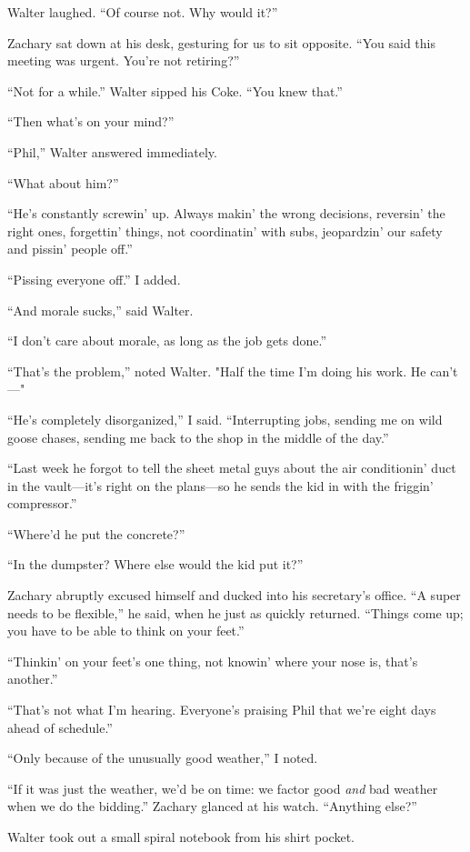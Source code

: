 Walter laughed. ``Of course not. Why would it?''

Zachary sat down at his desk, gesturing for us to sit opposite. ``You
said this meeting was urgent. You're not retiring?''

``Not for a while.'' Walter sipped his Coke. ``You knew that.''

``Then what's on your mind?''

``Phil,'' Walter answered immediately.

``What about him?''

``He's constantly screwin' up. Always makin' the wrong decisions,
reversin' the right ones, forgettin' things, not coordinatin' with subs,
jeopardzin' our safety and pissin' people off.''

``Pissing everyone off.'' I added.

``And morale sucks,'' said Walter.

``I don't care about morale, as long as the job gets done.''

``That's the problem,'' noted Walter. "Half the time I'm doing his work.
He can't---"

``He's completely disorganized,'' I said. ``Interrupting jobs, sending
me on wild goose chases, sending me back to the shop in the middle of
the day.''

``Last week he forgot to tell the sheet metal guys about the air
conditionin' duct in the vault---it's right on the plans---so he sends
the kid in with the friggin' compressor.''

``Where'd he put the concrete?''

``In the dumpster? Where else would the kid put it?''

Zachary abruptly excused himself and ducked into his secretary's office.
``A super needs to be flexible,'' he said, when he just as quickly
returned. ``Things come up; you have to be able to think on your feet.''

``Thinkin' on your feet's one thing, not knowin' where your nose is,
that's another.''

``That's not what I'm hearing. Everyone's praising Phil that we're eight
days ahead of schedule.''

``Only because of the unusually good weather,'' I noted.

``If it was just the weather, we'd be on time: we factor good \emph{and}
bad weather when we do the bidding.'' Zachary glanced at his watch.
``Anything else?''

Walter took out a small spiral notebook from his shirt pocket.


